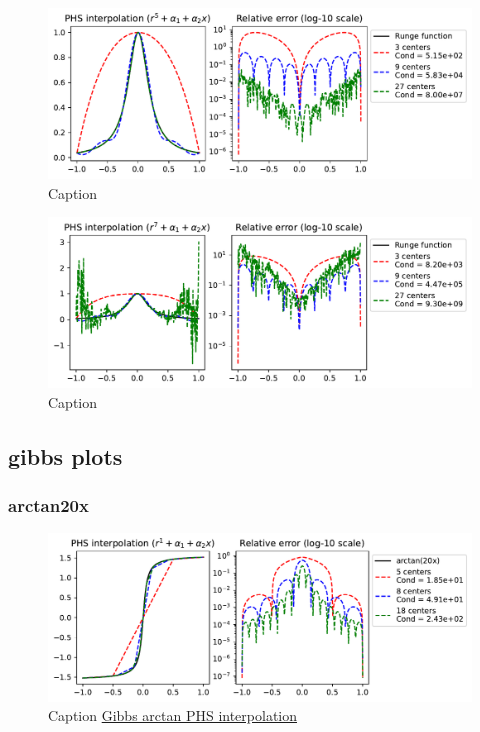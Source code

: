 \documentclass[12pt]{report} %
\begin{document}
\begin{figure}[ht]
  \centering
  \includegraphics[width=\textwidth]{imagenes/phs_interpolation/runge_phs_r5_deg1.pdf}
  \caption{Caption}
  \label{fig:phs-runge-phenomenon-deg-5}
\end{figure}

\begin{figure}[ht]
  \centering
  \includegraphics[width=\textwidth]{imagenes/phs_interpolation/runge_phs_r7_deg1.pdf}
  \caption{Caption}
  \label{fig:phs-runge-phenomenon-deg-7}
\end{figure}

\subsection{gibbs plots}
\subsubsection{arctan20x}
\begin{figure}[ht]
  \centering
  \includegraphics[width=\textwidth]{imagenes/phs_interpolation/arctan20x_r1_deg1.pdf}
  \caption{Caption \href{https://github.com/heqro/tfm-experiments/blob/main/introductory_notebooks/rbf_interpolation/gibbs.ipynb}{Gibbs arctan PHS interpolation}}
  \label{fig:arctan20x-r1-deg1}
\end{figure}
\end{document}
